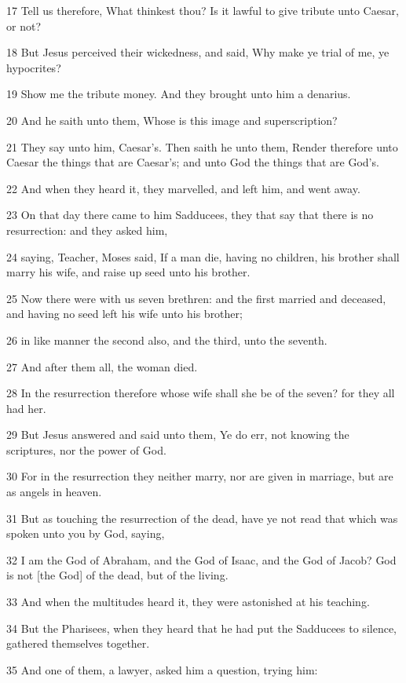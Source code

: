 \par 17 Tell us therefore, What thinkest thou? Is it lawful to give tribute unto Caesar, or not?
\par 18 But Jesus perceived their wickedness, and said, Why make ye trial of me, ye hypocrites?
\par 19 Show me the tribute money. And they brought unto him a denarius.
\par 20 And he saith unto them, Whose is this image and superscription?
\par 21 They say unto him, Caesar's. Then saith he unto them, Render therefore unto Caesar the things that are Caesar's; and unto God the things that are God's.
\par 22 And when they heard it, they marvelled, and left him, and went away.
\par 23 On that day there came to him Sadducees, they that say that there is no resurrection: and they asked him,
\par 24 saying, Teacher, Moses said, If a man die, having no children, his brother shall marry his wife, and raise up seed unto his brother.
\par 25 Now there were with us seven brethren: and the first married and deceased, and having no seed left his wife unto his brother;
\par 26 in like manner the second also, and the third, unto the seventh.
\par 27 And after them all, the woman died.
\par 28 In the resurrection therefore whose wife shall she be of the seven? for they all had her.
\par 29 But Jesus answered and said unto them, Ye do err, not knowing the scriptures, nor the power of God.
\par 30 For in the resurrection they neither marry, nor are given in marriage, but are as angels in heaven.
\par 31 But as touching the resurrection of the dead, have ye not read that which was spoken unto you by God, saying,
\par 32 I am the God of Abraham, and the God of Isaac, and the God of Jacob? God is not [the God] of the dead, but of the living.
\par 33 And when the multitudes heard it, they were astonished at his teaching.
\par 34 But the Pharisees, when they heard that he had put the Sadducees to silence, gathered themselves together.
\par 35 And one of them, a lawyer, asked him a question, trying him:
